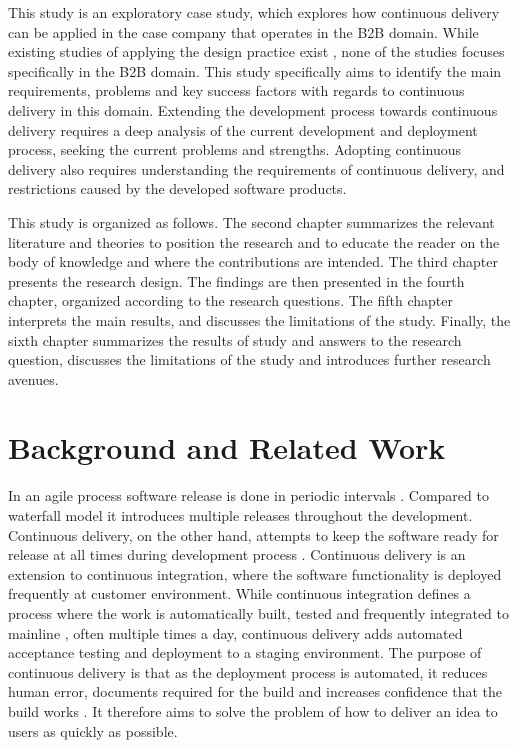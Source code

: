 \documentclass[lnbip]{svmultln}
\begin{document}
This study is an exploratory case study, which explores how continuous delivery can be applied in the case company that operates in the B2B domain. While existing studies of applying the design practice exist \cite{olsson2012climbing, neely2013continuous}, none of the studies focuses specifically in the B2B domain. This study specifically aims to identify the main requirements, problems and key success factors with regards to continuous delivery in this domain. Extending the development process towards continuous delivery requires a deep analysis of the current development and deployment process, seeking the current problems and strengths. Adopting continuous delivery also requires understanding the requirements of continuous delivery, and restrictions caused by the developed software products. 

This study is organized as follows. The second chapter summarizes the relevant literature and theories to position the research and to educate the reader on the body of knowledge and where the contributions are intended. The third chapter presents the research design. The findings are then presented in the fourth chapter, organized according to the research questions. The fifth chapter interprets the main results, and discusses the limitations of the study. Finally, the sixth chapter summarizes the results of study and answers to the research question, discusses the limitations of the study and introduces further research avenues.

\section{Background and Related Work}
In an agile process software release is done in periodic intervals \cite{cockburn2002agile}. Compared to waterfall model it introduces multiple releases throughout the development. Continuous delivery, on the other hand, attempts to keep the software ready for release at all times during development process \cite{cdbook}. Continuous delivery is an extension to continuous integration, where the software functionality is deployed frequently at customer environment. While continuous integration defines a process where the work is automatically built, tested and frequently integrated to mainline \cite{duvall2007continuous}, often multiple times a day, continuous delivery adds automated acceptance testing and deployment to a staging environment. The purpose of continuous delivery is that as the deployment process is automated, it reduces human error, documents required for the build and increases confidence that the build works \cite{cdbook}. It therefore aims to solve the problem of how to deliver an idea to users as quickly as possible.
\end{document}
